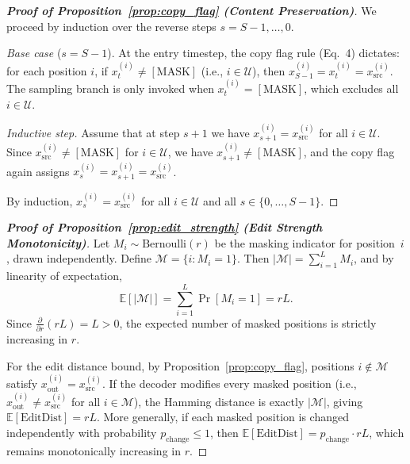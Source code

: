 \documentclass{article}
\begin{document}
\begin{proof}[\textbf{Proof of Proposition~\ref{prop:copy_flag} (Content Preservation)}]
We proceed by induction over the reverse steps $s = S{-}1, \ldots, 0$.

\emph{Base case} ($s = S{-}1$).
At the entry timestep, the copy flag rule (Eq.~4) dictates: for each position $i$, if $x_t^{(i)} \neq [\text{MASK}]$ (i.e., $i \in \mathcal{U}$), then $x_{S-1}^{(i)} = x_t^{(i)} = x_\text{src}^{(i)}$.
The sampling branch is only invoked when $x_t^{(i)} = [\text{MASK}]$, which excludes all $i \in \mathcal{U}$.

\emph{Inductive step.}
Assume that at step $s+1$ we have $x_{s+1}^{(i)} = x_\text{src}^{(i)}$ for all $i \in \mathcal{U}$.
Since $x_\text{src}^{(i)} \neq [\text{MASK}]$ for $i \in \mathcal{U}$, we have $x_{s+1}^{(i)} \neq [\text{MASK}]$, and the copy flag again assigns $x_s^{(i)} = x_{s+1}^{(i)} = x_\text{src}^{(i)}$.

By induction, $x_s^{(i)} = x_\text{src}^{(i)}$ for all $i \in \mathcal{U}$ and all $s \in \{0, \ldots, S{-}1\}$.
\end{proof}

\begin{proof}[\textbf{Proof of Proposition~\ref{prop:edit_strength} (Edit Strength Monotonicity)}]
Let $M_i \sim \text{Bernoulli}(r)$ be the masking indicator for position~$i$, drawn independently.
Define $\mathcal{M} = \{i : M_i = 1\}$.
Then $|\mathcal{M}| = \sum_{i=1}^{L} M_i$, and by linearity of expectation,
\[
\mathbb{E}[|\mathcal{M}|] = \sum_{i=1}^{L} \Pr[M_i = 1] = rL.
\]
Since $\frac{\partial}{\partial r}(rL) = L > 0$, the expected number of masked positions is strictly increasing in $r$.

For the edit distance bound, by Proposition~\ref{prop:copy_flag}, positions $i \notin \mathcal{M}$ satisfy $x_\text{out}^{(i)} = x_\text{src}^{(i)}$.
If the decoder modifies every masked position (i.e., $x_\text{out}^{(i)} \neq x_\text{src}^{(i)}$ for all $i \in \mathcal{M}$), the Hamming distance is exactly $|\mathcal{M}|$, giving $\mathbb{E}[\text{EditDist}] = rL$.
More generally, if each masked position is changed independently with probability $p_\text{change} \leq 1$, then $\mathbb{E}[\text{EditDist}] = p_\text{change} \cdot rL$, which remains monotonically increasing in $r$.
\end{proof}
\end{document}
